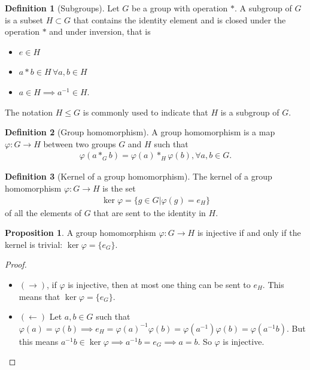 \documentclass{book}
\theoremstyle{definition}
\newtheorem{defn}{Definition}[section]
\newtheorem{prop}{Proposition}[section]
\begin{document}
\begin{defn}[Subgroups]
	Let $G$ be a group with operation $*$. A subgroup of  $G$ is a subset $H \subset G$ that contains the identity element and is closed under the operation $*$ and under inversion, that is 
	\begin{itemize}
		\item $e\in H$
		\item $a*b \in H \,\forall a,b\in H$
		\item $a\in H \implies a^{-1}\in H$.
	\end{itemize}
	The notation $H \leq G$ is commonly used to indicate that $H$ is a subgroup of $G$. 
\end{defn}


\begin{defn}[Group homomorphism]
	A group homomorphism is a map $\varphi: G \to H$ between two groups $G$ and $H$ such that 
	\begin{align}
	\varphi(a*_G b) = \varphi(a)*_H \varphi(b), \forall a,b \in G.
	\end{align}
\end{defn}





\begin{defn}[Kernel of a group homomorphism]
	The kernel of a group homomorphism $\varphi: G\to H$ is the set 
	\begin{align}
	\ker\varphi = \{ g\in G \vert \varphi(g) = e_H   \}
	\end{align}
	of all the elements of $G$ that are sent to the identity in $H$. 
\end{defn}

\begin{prop}
	A group homomorphism $\varphi: G\to H$ is injective if and only if the kernel is trivial: $\ker \varphi = \{ e_G\}$.
\end{prop}

\begin{proof}
	$\,$\\
	\begin{itemize}
	\item $(\rightarrow)$, if $\varphi$ is injective, then at most one thing can be sent to $e_H$. This means that $\ker\varphi = \{ e_G \}$.
	
	\item $(\leftarrow)$ Let $a,b\in G$ such that $\varphi(a) = \varphi(b) \implies e_H = \varphi(a)^{-1}\varphi(b) = \varphi(a^{-1})\varphi(b) = \varphi(a^{-1}b) $. But this means $a^{-1}b \in \ker{\varphi} \implies a^{-1}b = e_G \implies a=b$. So $\varphi$ is injective. 
	
	\end{itemize}
\end{proof}
\end{document}
